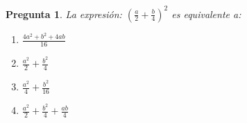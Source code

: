 \documentclass{article}
\newtheorem {Pregunta}{Pregunta}
\newenvironment{pregunta}{\begin{Pregunta} \rm}{\rm\end{Pregunta}}
\newenvironment{opciones}{\begin{enumerate}
    \renewcommand{\theenumi}{\Alph{enumi}}}
{\end{enumerate}\renewcommand{\theenumi}{\roman{enumi}}}
\begin{document}
\begin{pregunta}
La expresi\'on:
$(\frac{a}{2}+\frac{b}{4})^2$ es equivalente a:

\begin{opciones}
\item $\frac{4a^2+b^2+4ab}{16}$  %
\item $\frac{a^2}{2}+\frac{b^2}{4}$ %
\item $\frac{a^2}{4}+\frac{b^2}{16}$
\item $\frac{a^2}{2}+\frac{b^2}{4}+\frac{ab}{4}$ 
\end{opciones}

\end{pregunta}
\end{document}
